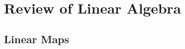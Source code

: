 %                                               
%                                                              
%



\section{Review of Linear Algebra }

\subsection{Linear Maps}


